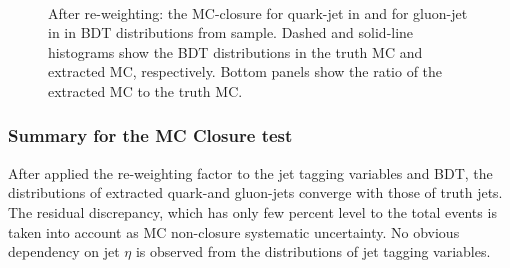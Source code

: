 \begin{figure}[htb]
	 \\
	\caption[]{
		After re-weighting: the MC-closure for quark-jet in   
		and for gluon-jet in    in BDT distributions from {} sample. %
		Dashed and solid-line histograms show the BDT distributions in the truth MC and extracted MC, respectively.
		Bottom panels show the ratio of the extracted MC to the truth MC. %
		\label{fig:QG-pythia-BDTMCExtractedQuarkFactor-BDT}
	}
\end{figure}





\FloatBarrier

\subsubsection{Summary for the MC Closure test}
\label{sec:mcclosure-summary}
After applied the re-weighting factor to the jet tagging variables {\ntrk} and BDT, the distributions of extracted quark-and gluon-jets converge with those of truth jets. The residual discrepancy, which has only few percent level to the total events is taken into account as MC non-closure systematic uncertainty. No obvious dependency on jet $\eta$ is observed from the distributions of jet tagging variables.

